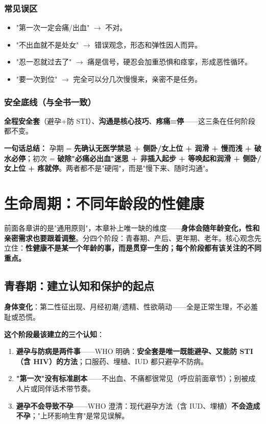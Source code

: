 \subsection{常见误区}

\begin{itemize}[leftmargin=2em,itemsep=0.3em]
  \item "第一次一定会痛/出血" $\rightarrow$ 不对。
  \item "不出血就不是处女" $\rightarrow$ 错误观念，形态和弹性因人而异。
  \item "忍一忍就过去了" $\rightarrow$ 痛是信号，硬忍会加重恐惧和痉挛，形成恶性循环。
  \item "要一次到位" $\rightarrow$ 完全可以分几次慢慢来，亲密不是任务。
\end{itemize}

\subsection{安全底线（与全书一致）}

\textbf{全程安全套}（避孕+防 STI）、\textbf{沟通是核心技巧}、\textbf{疼痛=停}——这三条在任何阶段都不变。

\vspace{1em}
\noindent\textbf{一句话总结：} 孕期 = \textbf{先确认无医学禁忌 + 侧卧/女上位 + 润滑 + 慢而浅 + 破水必停}；初次 = \textbf{破除"必痛必出血"迷思 + 非插入起步 + 等唤起和润滑 + 侧卧/女上位 + 疼就停}。两者都不是"硬闯"，而是"慢下来、随时沟通"。

\chapter{生命周期：不同年龄段的性健康}

前面各章讲的是"通用原则"，本章补上唯一缺的维度——\textbf{身体会随年龄变化，性和亲密需求也要跟着调整}。分四个阶段：青春期、产后、更年期、老年。核心观念先立住：\textbf{性健康不是某一个年龄的事，而是贯穿一生的；每个阶段都有该关注的不同重点。}

\section{青春期：建立认知和保护的起点}

\textbf{身体变化}：第二性征出现、月经初潮/遗精、性欲萌动——全是正常生理，不必羞耻或恐慌。

\textbf{这个阶段最该建立的三个认知}：

\begin{enumerate}[leftmargin=2em,itemsep=0.3em]
  \item \textbf{避孕与防病是两件事}——WHO 明确：\textbf{安全套是唯一既能避孕、又能防 STI（含 HIV）的方法}；口服药、埋植、IUD 都只避孕不防病。
  \item \textbf{"第一次"没有标准剧本}——不出血、不痛都很常见（呼应前面章节）；别被成人片或同伴话术带节奏。
  \item \textbf{避孕不会导致不孕}——WHO 澄清：现代避孕方法（含 IUD、埋植）\textbf{不会造成不孕}；"上环影响生育"是常见误解。
\end{enumerate}


